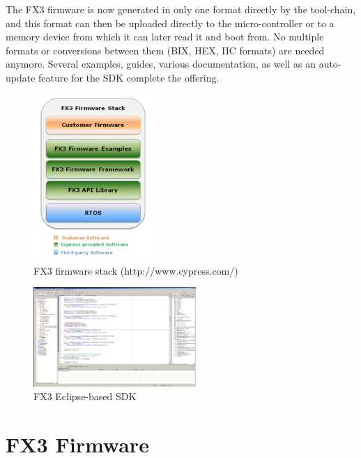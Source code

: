 \documentclass[a4paper,12pt]{report}
\begin{document}
The FX3 firmware is now generated in only one format directly by the tool-chain, and this format can then be uploaded directly to the micro-controller or to a memory device from which it can later read it and boot from. No multiple formats or conversions between them (BIX, HEX, IIC formats) are needed anymore.
Several examples, guides, various documentation, as well as an auto-update feature for the SDK complete the offering.

\begin{figure}[h]
\begin{center}
\includegraphics[width=0.4\textwidth]{fx3_stack}
\caption{FX3 firmware stack (http://www.cypress.com/)}
\label{fig:fx3_stack}
\end{center}
\end{figure}

\begin{figure}[h]
\begin{center}
\includegraphics[width=0.55\textwidth]{fx3_sdk}
\caption{FX3 Eclipse-based SDK}
\label{fig:fx3_sdk}
\end{center}
\end{figure}

\chapter{FX3 Firmware} \label{chap:fx3_firmware}
\end{document}
